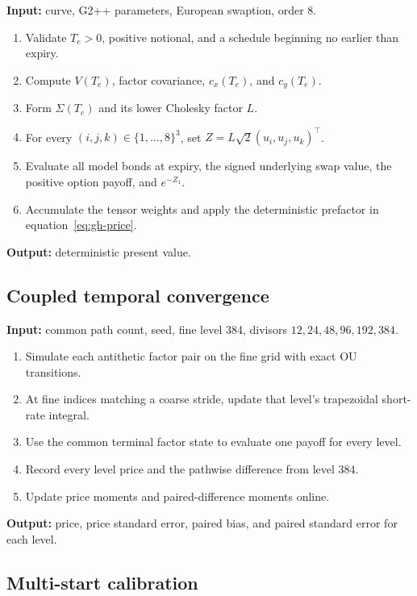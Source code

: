 \documentclass[11pt]{article}
\numberwithin{equation}{section}
\theoremstyle{definition}
\theoremstyle{remark}
\begin{document}
\noindent\textbf{Input:} curve, G2++ parameters, European swaption, order 8.
\begin{enumerate}
  \item Validate $T_e>0$, positive notional, and a schedule beginning no earlier
  than expiry.
  \item Compute $V(T_e)$, factor covariance, $c_x(T_e)$, and $c_y(T_e)$.
  \item Form $\Sigma(T_e)$ and its lower Cholesky factor $L$.
  \item For every $(i,j,k)\in\{1,\ldots,8\}^3$, set
  $Z=L\sqrt2(u_i,u_j,u_k)^\top$.
  \item Evaluate all model bonds at expiry, the signed underlying swap value,
  the positive option payoff, and $e^{-Z_1}$.
  \item Accumulate the tensor weights and apply the deterministic prefactor in
  equation~\eqref{eq:gh-price}.
\end{enumerate}
\noindent\textbf{Output:} deterministic present value.

\subsection{Coupled temporal convergence}

\noindent\textbf{Input:} common path count, seed, fine level 384, divisors
$12,24,48,96,192,384$.
\begin{enumerate}
  \item Simulate each antithetic factor pair on the fine grid with exact OU
  transitions.
  \item At fine indices matching a coarse stride, update that level's
  trapezoidal short-rate integral.
  \item Use the common terminal factor state to evaluate one payoff for every
  level.
  \item Record every level price and the pathwise difference from level 384.
  \item Update price moments and paired-difference moments online.
\end{enumerate}
\noindent\textbf{Output:} price, price standard error, paired bias, and paired
standard error for each level.

\subsection{Multi-start calibration}
\end{document}
